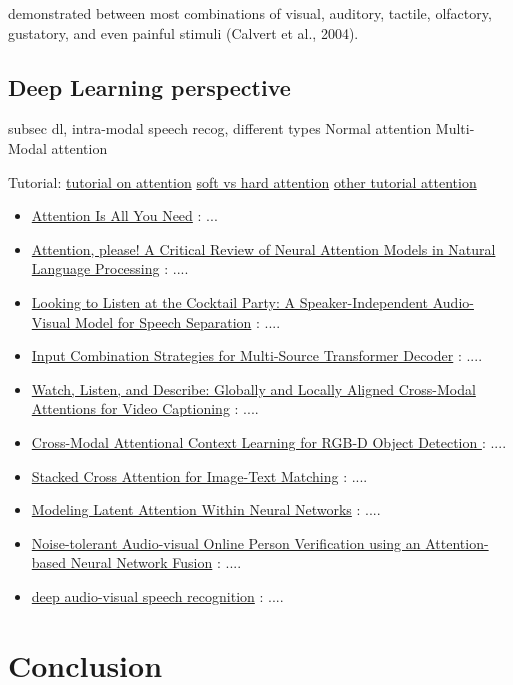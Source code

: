 demonstrated between most combinations of visual, auditory, tactile, olfactory, gustatory, and even painful stimuli (Calvert et al., 2004).


\subsection*{Deep Learning perspective}
subsec dl, intra-modal speech recog, different types
Normal attention
Multi-Modal attention

Tutorial: \href{https://krntneja.github.io/blog/2018/06/02/attention-based-models-1}{tutorial on attention} \href{https://jhui.github.io/2017/03/15/Soft-and-hard-attention/}{soft vs hard attention} \href{https://lilianweng.github.io/lil-log/2018/06/24/attention-attention.html}{other tutorial attention}
\begin{itemize}
\item \href{https://arxiv.org/abs/1706.03762}{Attention Is All You Need} \citep{attention-need}: ...
\item \href{https://arxiv.org/pdf/1902.02181.pdf}{Attention, please! A Critical Review of Neural Attention Models in
Natural Language Processing} \citep{attention-review}: ....
\item \href{https://arxiv.org/pdf/1804.03619.pdf}{Looking to Listen at the Cocktail Party: A Speaker-Independent Audio-Visual Model for Speech Separation} \citep{looking-to-listen}: ....
\item \href{https://arxiv.org/pdf/1811.04716v1.pdf}{Input Combination Strategies for Multi-Source Transformer Decoder} \citep{cross-transformer}: ....
\item \href{https://www.aclweb.org/anthology/N18-2125}{Watch, Listen, and Describe: Globally and Locally Aligned Cross-Modal Attentions for Video Captioning} \citep{crossmodal-video-caption}: ....
\item \href{https://arxiv.org/pdf/1810.12829.pdf}{Cross-Modal Attentional Context Learning for RGB-D Object Detection
} \citep{crossmodal-object-detection}: ....
\item \href{https://arxiv.org/abs/1803.08024}{Stacked Cross Attention for Image-Text Matching} \citep{stacked-attention}: ....
\item \href{https://arxiv.org/abs/1706.00536}{Modeling Latent Attention Within Neural Networks} \citep{latent-attention}: ....
\item \href{https://arxiv.org/abs/1811.10813}{Noise-tolerant Audio-visual Online Person Verification using an Attention-based Neural Network Fusion} \citep{audiovisual-attention}: ....
\item \href{https://arxiv.org/abs/1809.02108}{deep audio-visual speech recognition} \citep{afouras}: ....
\end{itemize}

\section{Conclusion}






